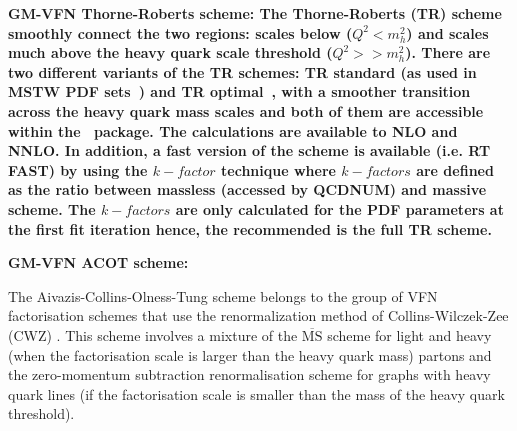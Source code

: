 \begin{description}
\item \bf {GM-VFN Thorne-Roberts scheme:} \rm
%
The Thorne-Roberts (TR) scheme smoothly connect the two regions: 
scales below ($Q^2<m_h^2$) and scales much above the heavy quark scale threshold ($Q^2>>m_h^2$). 
There are two different variants of the TR schemes: TR standard (as used in MSTW PDF 
sets~\cite{Thorne:2006qt,Martin:epC63}) 
and TR optimal~\cite{Thorne:6180}, with a smoother transition across the heavy quark mass scales 
and both of them are accessible within the \fitter\ package.
The calculations are available to NLO and NNLO. In addition, a fast version of the scheme 
is available (i.e. RT FAST) by using the $k-factor$ technique where $k-factors$ are defined 
as the ratio between massless (accessed by QCDNUM) and massive scheme. 
The $k-factors$ are only calculated for the PDF parameters at the first fit iteration
hence, the recommended is the full TR scheme.
\vspace{0.1cm}
\item \bf {GM-VFN ACOT scheme:} \rm

The Aivazis-Collins-Olness-Tung scheme belongs to the group of VFN 
factorisation schemes that use the renormalization method of 
Collins-Wilczek-Zee (CWZ) \cite{CWZ}.
This scheme involves a mixture of the $\overline{\text{MS}}$ scheme 
for light and heavy (when the factorisation scale is larger than the heavy quark mass) partons
and the zero-momentum subtraction renormalisation scheme for graphs with heavy quark lines 
(if the factorisation scale is smaller than the mass of the heavy quark threshold). 


\end{description}

